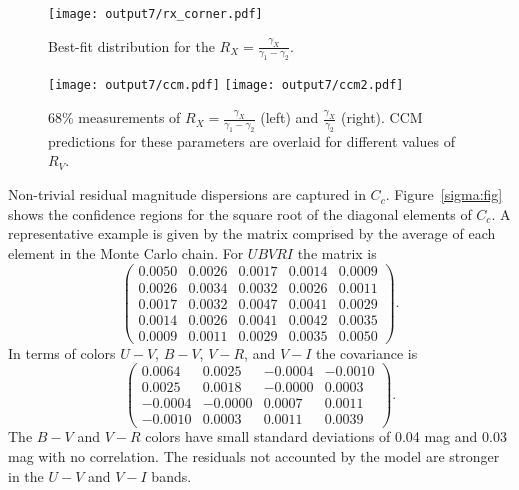 \documentclass[11pt, oneside]{article}   	%
\begin{document}
\begin{figure}[htbp] %
   \centering
   \texttt{[image: output7/rx\_corner.pdf]} 
   \caption{Best-fit distribution for the   $R_X=\frac{\gamma_X}{\gamma_1-\gamma_2}$.
   \label{rx:fig}}
\end{figure}

\begin{figure}[htbp] %
   \centering
   \texttt{[image: output7/ccm.pdf]}
      \texttt{[image: output7/ccm2.pdf]} 
   \caption{68\% measurements of $R_X=\frac{\gamma_X}{\gamma_1-\gamma_2}$ (left) and $\frac{\gamma_X}{\gamma_2}$ (right).  CCM
   predictions for these parameters are overlaid for different values of $R_V$.}
   \label{ccm:fig}
\end{figure}

Non-trivial residual magnitude dispersions are captured in $C_c$.   Figure~\ref{sigma:fig} shows the confidence regions for the
square root of the diagonal elements of $C_c$.
A representative example is given by the matrix comprised by the average of each element in the Monte Carlo chain.
For $UBVRI$ the matrix is
\begin{equation}
\begin{pmatrix}
0.0050 & 0.0026 & 0.0017 & 0.0014 & 0.0009 \\
0.0026 & 0.0034 & 0.0032 & 0.0026 & 0.0011 \\
0.0017 & 0.0032 & 0.0047 & 0.0041 & 0.0029 \\
0.0014 & 0.0026 & 0.0041 & 0.0042 & 0.0035 \\
0.0009 & 0.0011 & 0.0029 & 0.0035 & 0.0050
 \end{pmatrix}.
 \end{equation}
 In terms of colors $U-V$, $B-V$, $V-R$, and $V-I$ the covariance is
\begin{equation}
\begin{pmatrix}
0.0064 & 0.0025 & -0.0004 & -0.0010 \\
0.0025 & 0.0018 & -0.0000 & 0.0003 \\
-0.0004 & -0.0000 & 0.0007 & 0.0011 \\
-0.0010 & 0.0003 & 0.0011 & 0.0039
  \end{pmatrix}.
 \end{equation}
 The $B-V$ and $V-R$ colors have small standard deviations of  0.04 mag and 0.03 mag with no correlation.  The
 residuals not accounted by the
 model are stronger in the $U-V$ and $V-I$ bands.
 
\end{document}
